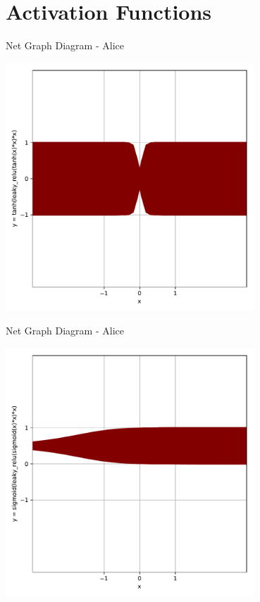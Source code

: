 \documentclass[a4paper, 12pt]{report}
\begin{document}
\section{\textbf{Activation Functions}}
\begin{blockfigure}{ Net Graph Diagram - Alice}
	\begin{center}
		\includegraphics[width = 0.7\textwidth]{tanh_leakyRelu_tanh}
	\end{center}
\end{blockfigure}
\newpage
\begin{blockfigure}{ Net Graph Diagram - Alice}
	\begin{center}
		\includegraphics[width = 0.7\textwidth]{sigmoid_leakyRelu_sigmoid}
	\end{center}
\end{blockfigure}
\end{document}
